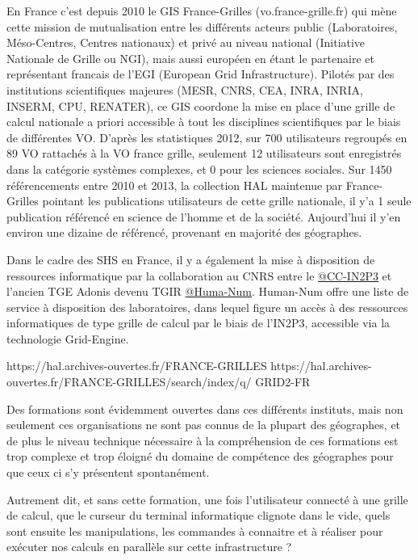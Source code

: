 En France c'est depuis 2010 le GIS France-Grilles (vo.france-grille.fr) qui mène cette mission de mutualisation entre les différents acteurs public (Laboratoires, Méso-Centres, Centres nationaux) et privé au niveau national (Initiative Nationale de Grille ou NGI), mais aussi européen en étant le partenaire et représentant francais de l'EGI (European Grid Infrastructure). Pilotés par des institutions scientifiques majeures (MESR, CNRS, CEA, INRA, INRIA, INSERM, CPU, RENATER), ce GIS coordone la mise en place d'une grille de calcul nationale a priori accessible à tout les disciplines scientifiques par le biais de différentes VO. D'après les statistiques 2012, sur 700 utilisateurs regroupés en 89 VO rattachés à la VO france grille, seulement 12 utilisateurs sont enregistrés dans la catégorie systèmes complexes, et 0 pour les sciences sociales. Sur 1450 référencements entre 2010 et 2013, la collection HAL maintenue par France-Grilles pointant les publications utilisateurs de cette grille nationale, il y'a 1 seule publication référencé en science de l'homme et de la société. Aujourd'hui il y'en environ une dizaine de référencé, provenant en majorité des géographes.

Dans le cadre des SHS en France, il y a également la mise à disposition de ressources informatique par la collaboration au CNRS entre le \href{http://cc.in2p3.fr/}{@CC-IN2P3} et l'ancien TGE Adonis devenu TGIR \href{http://www.huma-num.fr/}{@Huma-Num}. Human-Num offre une liste de service à disposition des laboratoires, dans lequel figure un accès à des ressources informatiques de type grille de calcul par le biais de l'IN2P3, accessible via la technologie Grid-Engine. 

https://hal.archives-ouvertes.fr/FRANCE-GRILLES
https://hal.archives-ouvertes.fr/FRANCE-GRILLES/search/index/q/%
GRID2-FR

Des formations sont évidemment ouvertes dans ces différents instituts, mais non seulement ces organisations ne sont pas connus de la plupart des géographes, et de plus le niveau technique nécessaire à la compréhension de ces formations est trop complexe et trop éloigné du domaine de compétence des géographes pour que ceux ci s'y présentent spontanément. 

Autrement dit, et sans cette formation, une fois l'utilisateur connecté à une grille de calcul, que le curseur du terminal informatique clignote dans le vide, quels sont ensuite les manipulations, les commandes à connaitre et à réaliser pour exécuter nos calculs en parallèle sur cette infrastructure ? 

